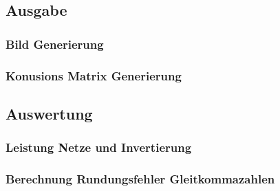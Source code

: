 \documentclass[Interploate_hadwritten_Digits.tex]{subfiles}
\begin{document}
	\subsection{Ausgabe}
	\subsubsection{Bild Generierung}
	
	\subsubsection{Konusions Matrix Generierung}
	
	
	\subsection{Auswertung}
	\subsubsection{Leistung Netze und Invertierung}
	
	\subsubsection{Berechnung Rundungsfehler Gleitkommazahlen}
	
\end{document}
